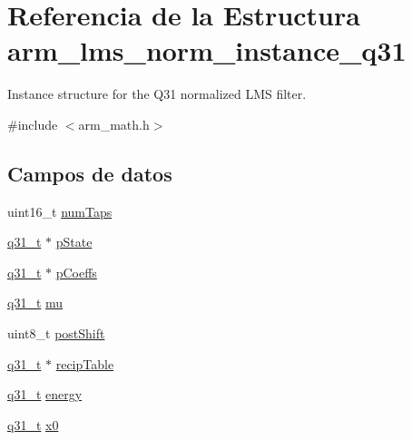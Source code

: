 \hypertarget{structarm__lms__norm__instance__q31}{}\section{Referencia de la Estructura arm\+\_\+lms\+\_\+norm\+\_\+instance\+\_\+q31}
\label{structarm__lms__norm__instance__q31}


Instance structure for the Q31 normalized L\+MS filter.  




{\ttfamily \#include $<$arm\+\_\+math.\+h$>$}

\subsection*{Campos de datos}
\begin{DoxyCompactItemize}
\item 
uint16\+\_\+t \hyperlink{structarm__lms__norm__instance__q31_a751941891e47f522a7f5375fe8990aac}{num\+Taps}
\item 
\hyperlink{arm__math_8h_adc89a3547f5324b7b3b95adec3806bc0}{q31\+\_\+t} $\ast$ \hyperlink{structarm__lms__norm__instance__q31_adee4ba3ee8869865af7d8fa08ca913d6}{p\+State}
\item 
\hyperlink{arm__math_8h_adc89a3547f5324b7b3b95adec3806bc0}{q31\+\_\+t} $\ast$ \hyperlink{structarm__lms__norm__instance__q31_a68888e36167d81cb7836db10367a1682}{p\+Coeffs}
\item 
\hyperlink{arm__math_8h_adc89a3547f5324b7b3b95adec3806bc0}{q31\+\_\+t} \hyperlink{structarm__lms__norm__instance__q31_a21ab4237a726ea7751f5026d89d2e577}{mu}
\item 
uint8\+\_\+t \hyperlink{structarm__lms__norm__instance__q31_a74050e9f36542bd56f4052381a82ae8f}{post\+Shift}
\item 
\hyperlink{arm__math_8h_adc89a3547f5324b7b3b95adec3806bc0}{q31\+\_\+t} $\ast$ \hyperlink{structarm__lms__norm__instance__q31_aec8a88dd688519b6b1e3c8d2e24bb775}{recip\+Table}
\item 
\hyperlink{arm__math_8h_adc89a3547f5324b7b3b95adec3806bc0}{q31\+\_\+t} \hyperlink{structarm__lms__norm__instance__q31_a012fee0f71095d2557bb633e73ef7355}{energy}
\item 
\hyperlink{arm__math_8h_adc89a3547f5324b7b3b95adec3806bc0}{q31\+\_\+t} \hyperlink{structarm__lms__norm__instance__q31_a973b8350a0c7b113a5f002bc0b86bf76}{x0}
\end{DoxyCompactItemize}


